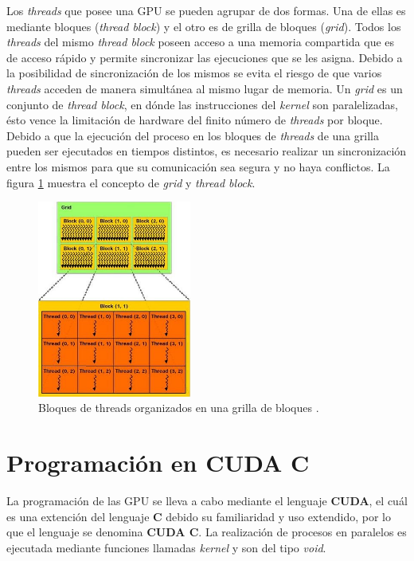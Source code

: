 Los \textit{threads} que posee una GPU se pueden agrupar de dos formas. Una de ellas es mediante bloques (\textit{thread block}) y el otro es de grilla de bloques (\textit{grid}). Todos los \textit{threads} del mismo \textit{thread block} poseen acceso a una memoria compartida que es de acceso rápido y permite sincronizar las ejecuciones que se les asigna. Debido a la posibilidad de sincronización de los mismos se evita el riesgo de que varios \textit{threads} acceden de manera simultánea al mismo lugar de memoria. Un \textit{grid} es un conjunto de \textit{thread block}, en dónde las instrucciones del \textit{kernel} son paralelizadas, ésto vence la limitación de hardware del finito número de \textit{threads} por bloque. Debido a que la ejecución del proceso en los bloques de \textit{threads} de una grilla pueden ser ejecutados en tiempos distintos, es necesario realizar un sincronización entre los mismos para que su comunicación sea segura y no haya conflictos\cite{tolke2010implementation}. La figura \ref{fig:block_grid_threads} muestra el concepto de \textit{grid} y \textit{thread block}.

\newpage
\begin{figure}[h!]
	\centering
	\includegraphics[width=0.45\textwidth]{figs/cap3/threads_block_grid.jpg}
	\caption{Bloques de threads organizados en una grilla de bloques \cite{rinaldi2011modelos}.}
	\label{fig:block_grid_threads}
\end{figure}

\section{Programación en CUDA C}

La programación de las GPU se lleva a cabo mediante el lenguaje \textbf{CUDA}, el cuál es una extención del lenguaje \textbf{C} debido su familiaridad y uso extendido, por lo que el lenguaje se denomina \textbf{CUDA C}. La realización de procesos en paralelos es ejecutada mediante funciones llamadas \textit{kernel} y son del tipo \textit{void}.

